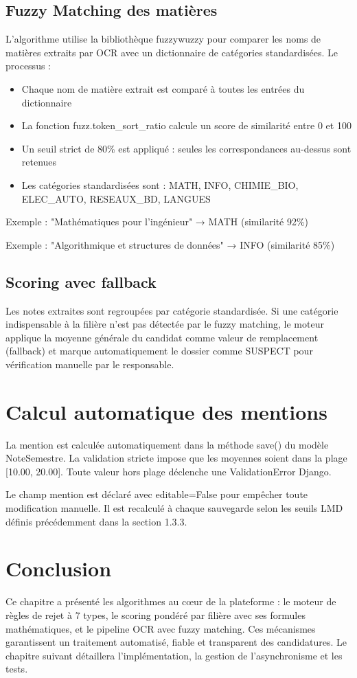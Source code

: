 \subsection{Fuzzy Matching des matières}

L'algorithme utilise la bibliothèque fuzzywuzzy pour comparer les noms de matières extraits par OCR avec un dictionnaire de catégories standardisées. Le processus :

\begin{itemize}
\item Chaque nom de matière extrait est comparé à toutes les entrées du dictionnaire
\item La fonction fuzz.token\_sort\_ratio calcule un score de similarité entre 0 et 100
\item Un seuil strict de 80\% est appliqué : seules les correspondances au-dessus sont retenues
\item Les catégories standardisées sont : MATH, INFO, CHIMIE\_BIO, ELEC\_AUTO, RESEAUX\_BD, LANGUES
\end{itemize}

Exemple : "Mathématiques pour l'ingénieur" → MATH (similarité 92\%)

Exemple : "Algorithmique et structures de données" → INFO (similarité 85\%)

\subsection{Scoring avec fallback}

Les notes extraites sont regroupées par catégorie standardisée. Si une catégorie indispensable à la filière n'est pas détectée par le fuzzy matching, le moteur applique la moyenne générale du candidat comme valeur de remplacement (fallback) et marque automatiquement le dossier comme SUSPECT pour vérification manuelle par le responsable.

\section{Calcul automatique des mentions}

La mention est calculée automatiquement dans la méthode save() du modèle NoteSemestre. La validation stricte impose que les moyennes soient dans la plage [10.00, 20.00]. Toute valeur hors plage déclenche une ValidationError Django.

Le champ mention est déclaré avec editable=False pour empêcher toute modification manuelle. Il est recalculé à chaque sauvegarde selon les seuils LMD définis précédemment dans la section 1.3.3.

\section{Conclusion}

Ce chapitre a présenté les algorithmes au cœur de la plateforme : le moteur de règles de rejet à 7 types, le scoring pondéré par filière avec ses formules mathématiques, et le pipeline OCR avec fuzzy matching. Ces mécanismes garantissent un traitement automatisé, fiable et transparent des candidatures. Le chapitre suivant détaillera l'implémentation, la gestion de l'asynchronisme et les tests.

